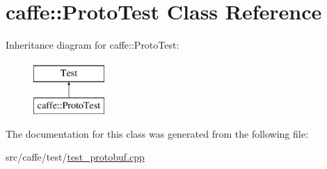 \hypertarget{classcaffe_1_1_proto_test}{\section{caffe\+:\+:Proto\+Test Class Reference}
\label{classcaffe_1_1_proto_test}
}
Inheritance diagram for caffe\+:\+:Proto\+Test\+:\begin{figure}[H]
\begin{center}
\leavevmode
\includegraphics[height=2.000000cm]{classcaffe_1_1_proto_test}
\end{center}
\end{figure}


The documentation for this class was generated from the following file\+:\begin{DoxyCompactItemize}
\item 
src/caffe/test/\hyperlink{test__protobuf_8cpp}{test\+\_\+protobuf.\+cpp}\end{DoxyCompactItemize}

